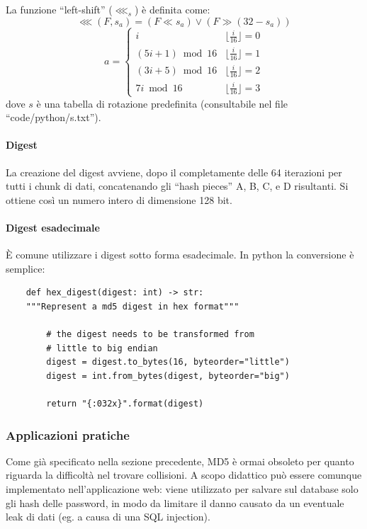 La funzione ``left-shift'' ($\lll_s$) è definita come:
$$
    \lll(F, s_a) = (F \ll s_a) \lor (F \gg (32 - s_a))
$$
\begin{equation*}
    a =  \left\{
    \begin{array}{ll}
        i                 & \lfloor \frac{i}{16} \rfloor = 0 \\
        (5i + 1) \bmod 16 & \lfloor \frac{i}{16} \rfloor = 1 \\
        (3i + 5) \bmod 16 & \lfloor \frac{i}{16} \rfloor = 2 \\
        7i \bmod 16       & \lfloor \frac{i}{16} \rfloor = 3
    \end{array}
    \right.
\end{equation*}
dove $s$ è una tabella di rotazione predefinita (consultabile nel file ``code/python/s.txt'').

\paragraph{Digest}
La creazione del digest avviene, dopo il completamente delle 64 iterazioni per tutti i chunk di dati, concatenando gli ``hash pieces'' A, B, C, e D risultanti. Si ottiene così un numero intero di dimensione 128 bit.

\paragraph{Digest esadecimale}
È comune utilizzare i digest sotto forma esadecimale. In python la conversione è semplice:
\begin{lstlisting}
    def hex_digest(digest: int) -> str:
    """Represent a md5 digest in hex format"""

        # the digest needs to be transformed from
        # little to big endian
        digest = digest.to_bytes(16, byteorder="little")
        digest = int.from_bytes(digest, byteorder="big")

        return "{:032x}".format(digest)
\end{lstlisting}

\subsubsection{Applicazioni pratiche}

Come già specificato nella sezione precedente, MD5 è ormai obsoleto per quanto riguarda la difficoltà nel trovare collisioni. A scopo didattico può essere comunque implementato nell'applicazione web: viene utilizzato per salvare sul database solo gli hash delle password, in modo da limitare il danno causato da un eventuale leak di dati (eg. a causa di una SQL injection).


